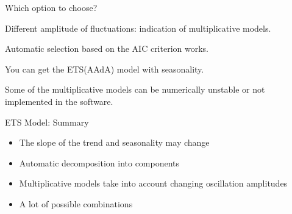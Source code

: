\begin{frame}{Which option to choose?}
	
	\alert{Different amplitude} of fluctuations: indication of multiplicative models.
	
	\pause
	
	Automatic selection based on the \alert{AIC} criterion works.
	
	\pause
	
	
	You can get the ETS(AAdA) model \alert{with seasonality}.
	
	\pause
	
	Some of the multiplicative models can be \alert{numerically unstable}
	or \alert{not implemented} in the software.
	
\end{frame}



\begin{frame}{ETS Model: Summary}
	
	\begin{itemize}[<+->]
		\item The slope of the trend  and seasonality may change
		\item Automatic decomposition into components
		\item Multiplicative models take into account \alert{changing} oscillation amplitudes
		\item A lot of possible \alert{combinations}
	\end{itemize}
\end{frame}




